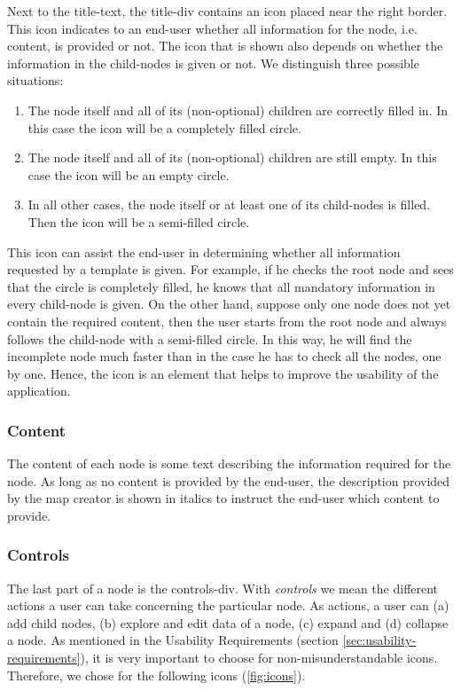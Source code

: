 Next to the title-text, the title-div contains an icon placed near the right border. This icon indicates to an end-user whether all information for the node, i.e. content, is provided or not. The icon that is shown also depends on whether the information in the child-nodes is given or not. We distinguish three possible situations:
\begin{enumerate}
	\item The node itself and all of its (non-optional) children are correctly filled in. In this case the icon will be a completely filled circle.
	\item The node itself and all of its (non-optional) children are still empty. In this case the icon will be an empty circle.
	\item In all other cases, the node itself or at least one of its child-nodes is filled. Then the icon will be a semi-filled circle.
\end{enumerate}
This icon can assist the end-user in determining whether all information requested by a template is given. For example, if he checks the root node and sees that the circle is completely filled, he knows that all mandatory information in every child-node is given. On the other hand, suppose only one node does not yet contain the required content, then the user starts from the root node and always follows the child-node with a semi-filled circle. In this way, he will find the incomplete node much faster than in the case he has to check all the nodes, one by one. Hence, the icon is an element that helps to improve the usability of the application.



\subsubsection{Content}\label{sec:content}
The content of each node is some text describing the information required for the node. As long as no content is provided by the end-user, the description provided by the map creator is shown in italics to instruct the end-user which content to provide.



\subsubsection{Controls}\label{sec:controls}
The last part of a node is the controls-div. With \textit{controls} we mean the different actions a user can take concerning the particular node. As actions, a user can (a) add child nodes, (b) explore and edit data of a node, (c) expand and (d) collapse a node. As mentioned in the Usability Requirements (section \ref{sec:usability-requirements}), it is very important to choose for non-misunderstandable icons. Therefore, we chose for the following icons (\autoref{fig:icons}).

